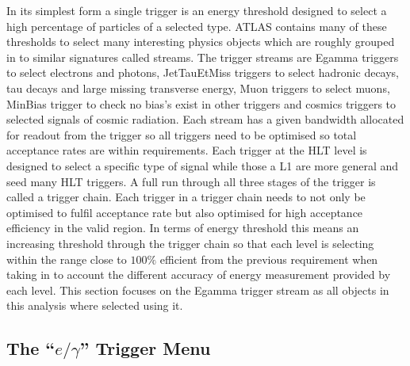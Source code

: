 	In its simplest form a single trigger is an energy threshold designed to select a high percentage of particles of a selected type. ATLAS contains many of these thresholds to select many interesting physics objects which are roughly grouped in to similar signatures called streams. The trigger streams are Egamma triggers to select electrons and photons, JetTauEtMiss triggers to select hadronic decays, tau decays and large missing transverse energy, Muon triggers to select muons, MinBias trigger to check no bias's exist in other triggers and cosmics triggers to selected signals of cosmic radiation. Each stream has a given bandwidth allocated for readout from the trigger so all triggers need to be optimised so total acceptance rates are within requirements. Each trigger at the HLT level is designed to select a specific type of signal while those a L1 are more general and seed many HLT triggers. A full run through all three stages of the trigger is called a trigger chain. Each trigger in a trigger chain needs to not only be optimised to fulfil acceptance rate but also optimised for high acceptance efficiency in the valid region. In terms of energy threshold this means an increasing threshold through the trigger chain so that each level is selecting within the range close to $100\%$ efficient from the previous requirement when taking in to account the different accuracy of energy measurement provided by each level. This section focuses on the Egamma trigger stream as all objects in this analysis where selected using it.





	\subsection{The ``$e/\gamma$'' Trigger Menu} 
		\label{sec:egammaMenu}

